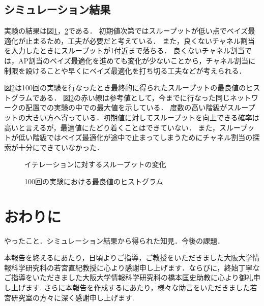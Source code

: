 \documentclass[a4paper,11pt]{jarticle}
\begin{document}
\subsection{シミュレーション結果}
実験の結果は図\ref{hetero}，\ref{histogram}である．
初期値次第ではスループットが低い点でベイズ最適化が止まるため，工夫が必要だと考えている．
また，良くないチャネル割当を入力したときにスループットが1付近まで落ちる．
良くないチャネル割当では，AP割当のベイズ最適化を進めても変化が少ないことから，チャネル割当に制限を設けることや早くにベイズ最適化を打ち切る工夫などが考えられる．

図\ref{histogram}は100回の実験を行なったとき最終的に得られたスループットの最良値のヒストグラムである．
図\ref{histogram}の赤い線は参考値として，今までに行なった同じネットワークの配置での実験の中での最大値を示している．
度数の高い階級がスループットの大きい方へ寄っている．初期値に対してスループットを向上できる確率は高いと言えるが，最適値にたどり着くことはできていない．
また，スループットが低い階級ではベイズ最適化が途中で止まってしまうためにチャネル割当の探索が十分にできていなかった．

\begin{figure}[t]
  \centering
  
  \caption{イテレーションに対するスループットの変化}
  \label{hetero}
\end{figure}

\begin{figure}[t]
  \centering
  
  \caption{100回の実験における最良値のヒストグラム}
  \label{histogram}
\end{figure}

\section{おわりに}
やったこと．シミュレーション結果から得られた知見．今後の課題．

\acknowledgement
本報告を終えるにあたり，日頃よりご指導，ご教授をいただきました大阪大学情報科学研究科の若宮直紀教授に心より感謝申し上げます．ならびに，終始丁寧なご指導をいただきました大阪大学情報科学研究科の橋本匡史助教に心より御礼申し上げます. さらに本報告を作成するにあたり，様々な助言をいただきました若宮研究室の方々に深く感謝申し上げます.



\end{document}
